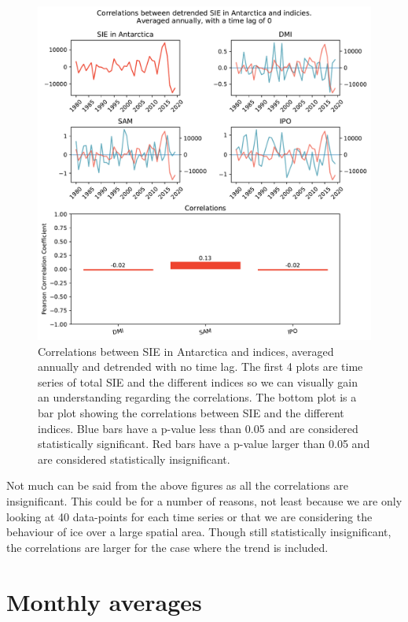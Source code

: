 \begin{figure}[H]
    \centering
    \includegraphics[width=\linewidth]{Images_3.0/correlations/subplots_indicies_annually_0_anomalous_detrended.pdf}
    \caption[Correlations between SIE in Antarctica and indices, averaged annually and detrended with no time lag.]{Correlations between SIE in Antarctica and indices, averaged annually and detrended with no time lag. The first 4 plots are time series of total SIE and the different indices so we can visually gain an understanding regarding the correlations. The bottom plot is a bar plot showing the correlations between SIE and the different indices. Blue bars have a p-value less than 0.05 and are considered statistically significant. Red bars have a p-value larger than 0.05 and are considered statistically insignificant.}
    \label{fig:annual_without_trend}
\end{figure}
Not much can be said from the above figures as all the correlations are insignificant. This could be for a number of reasons, not least because we are only looking at 40 data-points for each time series or that we are considering the behaviour of ice over a large spatial area. Though still statistically insignificant, the correlations are larger for the case where the trend is included.


\section{Monthly averages}

